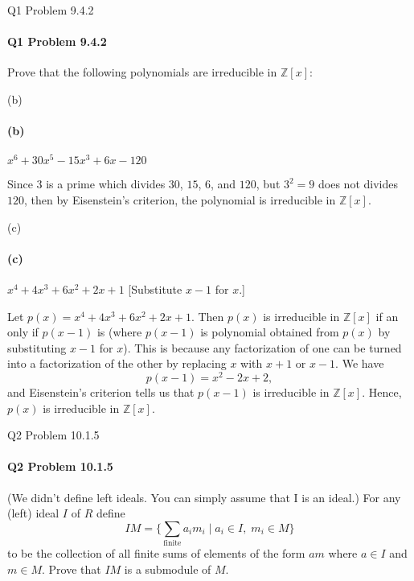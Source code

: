 \documentclass[12pt]{article}
\newenvironment{fullbox}{\begin{lrbox}{\savefullbox}\begin{minipage}{\dimexpr\textwidth-2\fboxsep\relax}}{\end{minipage}\end{lrbox}\begin{center}\framebox[\textwidth]{\usebox{\savefullbox}}\end{center}}
\newenvironment{pbox}[1][]{\begin{fullbox}\ifx#1\empty\else\paragraph{#1}\fi}{\end{fullbox}}
\theoremstyle{definition}
\newcommand{\Z}{\mathbb{Z}}
\begin{document}
\thispagestyle{title}


\begin{pbox}[Q1 Problem 9.4.2]
    Prove that the following polynomials are irreducible in $\Z[x]$:
\end{pbox}

\begin{pbox}[(b)]
    $x^6 +30x^5 - 15x^3 + 6x -120$
\end{pbox}

Since $3$ is a prime which divides $30$, $15$, $6$, and $120$, but $3^2 = 9$ does not divides $120$, then by Eisenstein's criterion, the polynomial is irreducible in $\Z[x]$.

\begin{pbox}[(c)]
    $x^4 + 4x^3 + 6x^2 + 2x + 1$ [Substitute $x-1$ for $x$.]
\end{pbox}

Let $p(x) = x^4 + 4x^3 + 6x^2 + 2x + 1$. Then $p(x)$ is irreducible in $\Z[x]$ if an only if $p(x-1)$ is (where $p(x-1)$ is polynomial obtained from $p(x)$ by substituting $x-1$ for $x$). This is because any factorization of one can be turned into a factorization of the other by replacing $x$ with $x+1$ or $x-1$. We have
\[
    p(x-1) = x^2 - 2x + 2,
\]
and Eisenstein's criterion tells us that $p(x-1)$ is irreducible in $\Z[x]$. Hence, $p(x)$ is irreducible in $\Z[x]$.




\begin{pbox}[Q2 Problem 10.1.5]
    (We didn't define left ideals. You can simply assume that I is an ideal.) For any (left) ideal $I$ of $R$ define
    \[
        IM = \{\sum_{\text{finite}} a_i m_i \mid a_i \in I,\; m_i \in M\}
    \]
    to be the collection of all finite sums of elements of the form $am$ where $a \in I$ and $m \in M$. Prove that $IM$ is a submodule of $M$.
\end{pbox}
\end{document}
